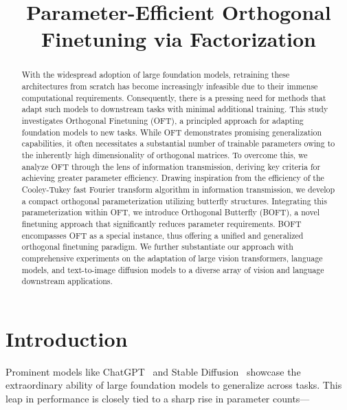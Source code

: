 \title{Parameter-Efficient Orthogonal Finetuning via Factorization}

\begin{abstract}
With the widespread adoption of large foundation models, retraining these architectures from scratch has become increasingly infeasible due to their immense computational requirements. Consequently, there is a pressing need for methods that adapt such models to downstream tasks with minimal additional training. This study investigates Orthogonal Finetuning (OFT), a principled approach for adapting foundation models to new tasks. While OFT demonstrates promising generalization capabilities, it often necessitates a substantial number of trainable parameters owing to the inherently high dimensionality of orthogonal matrices. To overcome this, we analyze OFT through the lens of information transmission, deriving key criteria for achieving greater parameter efficiency. Drawing inspiration from the efficiency of the Cooley-Tukey fast Fourier transform algorithm in information transmission, we develop a compact orthogonal parameterization utilizing butterfly structures. Integrating this parameterization within OFT, we introduce Orthogonal Butterfly (BOFT), a novel finetuning approach that significantly reduces parameter requirements. BOFT encompasses OFT as a special instance, thus offering a unified and generalized orthogonal finetuning paradigm. We further substantiate our approach with comprehensive experiments on the adaptation of large vision transformers, language models, and text-to-image diffusion models to a diverse array of vision and language downstream applications.
\end{abstract}

\section{Introduction}

Prominent models like ChatGPT~\cite{brown2020language,chen2021evaluating} and Stable Diffusion~\cite{rombach2022high} showcase the extraordinary ability of large foundation models to generalize across tasks. This leap in performance is closely tied to a sharp rise in parameter counts—

